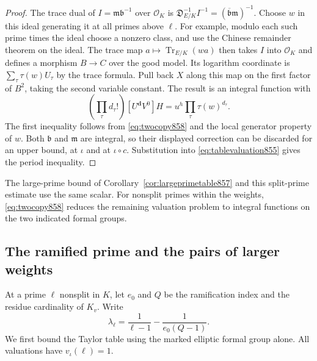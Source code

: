 \documentclass[a4paper,11pt]{article}
\theoremstyle{definition}
\theoremstyle{remark}
\numberwithin{equation}{section}
\begin{document}
\begin{proof}
The trace dual of \(I=\mathfrak m\mathfrak b^{-1}\) over
\(\mathcal O_K\) is
\(\mathfrak D_{E/K}^{-1}I^{-1}
       =(\overline{\mathfrak b}\mathfrak m)^{-1}\).
Choose \(w\) in this ideal generating it at all primes above
\(\ell\). For example, modulo each such prime times the ideal
choose a nonzero class, and use the Chinese remainder theorem
on the ideal. The trace map \(a\mapsto\operatorname{Tr}_{E/K}(wa)\)
then takes \(I\) into \(\mathcal O_K\) and defines a morphism
\(B\to C\) over the good model. Its logarithm coordinate is
\(\sum_\tau \tau(w)U_\tau\) by the trace formula. Pull back
\(X\) along this map on the first factor of \(B^2\), taking
the second variable constant. The result is an integral
function with
\[
   \left(\prod_\tau d_\tau!\right)[U^{\mathbf d}V^0]H
                        =u^{h}\prod_\tau \tau(w)^{d_\tau}.
\]
The first inequality follows from \eqref{eq:twocopy858} and
the local generator property of \(w\). Both \(\mathfrak b\)
and \(\mathfrak m\) are integral, so their displayed correction
can be discarded for an upper bound, at \(\iota\) and at
\(\iota\circ c\). Substitution into
\eqref{eq:tablevaluation855} gives the period inequality.
\end{proof}

The large-prime bound of Corollary~\ref{cor:largeprimetable857}
and this split-prime estimate use the same scalar. For
nonsplit primes within the weights, \eqref{eq:twocopy858}
reduces the remaining valuation problem to integral functions
on the two indicated formal groups.
\clearpage

\subsection{The ramified prime and the pairs of larger weights}
\label{sec:shortpairs859}
At a prime \(\ell\) nonsplit in \(K\), let \(e_0\) and \(Q\) be
the ramification index and the residue cardinality of \(K_v\).
Write
\[
           \lambda_\ell=\frac1{\ell-1}-\frac1{e_0(Q-1)} .
\]
We first bound the Taylor table using the marked elliptic
formal group alone. All valuations have \(v_\iota(\ell)=1\).
\end{document}

